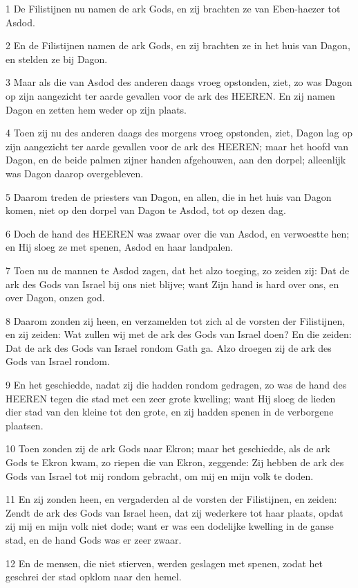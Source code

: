 \par 1 De Filistijnen nu namen de ark Gods, en zij brachten ze van Eben-haezer tot Asdod.
\par 2 En de Filistijnen namen de ark Gods, en zij brachten ze in het huis van Dagon, en stelden ze bij Dagon.
\par 3 Maar als die van Asdod des anderen daags vroeg opstonden, ziet, zo was Dagon op zijn aangezicht ter aarde gevallen voor de ark des HEEREN. En zij namen Dagon en zetten hem weder op zijn plaats.
\par 4 Toen zij nu des anderen daags des morgens vroeg opstonden, ziet, Dagon lag op zijn aangezicht ter aarde gevallen voor de ark des HEEREN; maar het hoofd van Dagon, en de beide palmen zijner handen afgehouwen, aan den dorpel; alleenlijk was Dagon daarop overgebleven.
\par 5 Daarom treden de priesters van Dagon, en allen, die in het huis van Dagon komen, niet op den dorpel van Dagon te Asdod, tot op dezen dag.
\par 6 Doch de hand des HEEREN was zwaar over die van Asdod, en verwoestte hen; en Hij sloeg ze met spenen, Asdod en haar landpalen.
\par 7 Toen nu de mannen te Asdod zagen, dat het alzo toeging, zo zeiden zij: Dat de ark des Gods van Israel bij ons niet blijve; want Zijn hand is hard over ons, en over Dagon, onzen god.
\par 8 Daarom zonden zij heen, en verzamelden tot zich al de vorsten der Filistijnen, en zij zeiden: Wat zullen wij met de ark des Gods van Israel doen? En die zeiden: Dat de ark des Gods van Israel rondom Gath ga. Alzo droegen zij de ark des Gods van Israel rondom.
\par 9 En het geschiedde, nadat zij die hadden rondom gedragen, zo was de hand des HEEREN tegen die stad met een zeer grote kwelling; want Hij sloeg de lieden dier stad van den kleine tot den grote, en zij hadden spenen in de verborgene plaatsen.
\par 10 Toen zonden zij de ark Gods naar Ekron; maar het geschiedde, als de ark Gods te Ekron kwam, zo riepen die van Ekron, zeggende: Zij hebben de ark des Gods van Israel tot mij rondom gebracht, om mij en mijn volk te doden.
\par 11 En zij zonden heen, en vergaderden al de vorsten der Filistijnen, en zeiden: Zendt de ark des Gods van Israel heen, dat zij wederkere tot haar plaats, opdat zij mij en mijn volk niet dode; want er was een dodelijke kwelling in de ganse stad, en de hand Gods was er zeer zwaar.
\par 12 En de mensen, die niet stierven, werden geslagen met spenen, zodat het geschrei der stad opklom naar den hemel.

